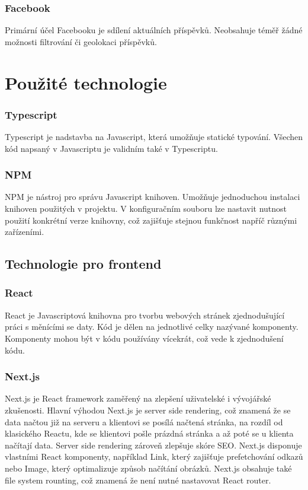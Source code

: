 \documentclass[12pt, a4paper,
 twoside,        %
 openright
]{report}
\begin{document}
\subsection{Facebook}
Primární účel Facebooku je sdílení aktuálních příspěvků. Neobsahuje téměř žádné možnosti filtrování či geolokaci příspěvků. 
\
\chapter{Použité technologie}
\subsection{Typescript}
Typescript je nadstavba na Javascript, která umožňuje statické typování. Všechen kód napsaný v Javascriptu je validním také v Typescriptu. 
\subsection{NPM}
NPM je nástroj pro správu Javascript knihoven. Umožňuje jednoduchou instalaci knihoven použitých v projektu. V konfiguračním souboru lze nastavit nutnost použití konkrétní verze knihovny, což zajišťuje stejnou funkčnost napříč různými zařízeními. 
\section{Technologie pro frontend}
\subsection{React}
React je Javascriptová knihovna pro tvorbu webových stránek zjednodušující práci s měnícími se daty. Kód je dělen na jednotlivé celky nazývané komponenty. Komponenty mohou být v kódu používány vícekrát, což vede k zjednodušení kódu.
\subsection{Next.js}
Next.js je React framework zaměřený na zlepšení uživatelské i vývojářské zkušenosti. Hlavní výhodou Next.js je server side rendering, což znamená že se data načtou již na serveru a klientovi se posílá načtená stránka, na rozdíl od klasického Reactu, kde se klientovi pošle prázdná stránka a až poté se u klienta načítají data. Server side rendering zároveň zlepšuje skóre SEO. Next.js disponuje vlastními React komponenty, například Link, který zajišťuje prefetchování odkazů nebo Image, který optimalizuje způsob načítání obrázků. Next.js obsahuje také file system rounting, což znamená že není nutné nastavovat React router.
\end{document}
